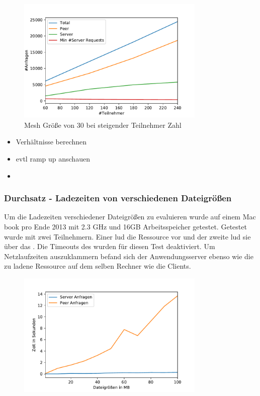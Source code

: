 \begin{figure}[!h]
	\centering
	\includegraphics[width=0.8\textwidth]{figures/meshed_30_line}
	\caption[A Figure Short-Title]{Mesh Größe von 30 bei steigender Teilnehmer Zahl}
	\label{fig:meshed_30_line}
\end{figure}

\begin{itemize}
	\item Verhältnisse berechnen
	\item evtl ramp up anschauen
	\item  
\end{itemize}

\subsubsection{Durchsatz - Ladezeiten von verschiedenen Dateigrößen}
Um die Ladezeiten verschiedener Dateigrößen zu evaluieren wurde auf einem Mac book pro Ende 2013 mit 2.3 GHz und 16GB Arbeitsspeicher getestet. 
Getestet wurde mit zwei Teilnehmern. Einer lud die Ressource vor und der zweite lud sie über das \pTp \cdn. Die Timeouts des \pTp \cdns wurden für diesen Test deaktiviert. Um Netzlaufzeiten auszuklammern befand sich der Anwendungsserver ebenso wie die zu ladene Ressource auf dem selben Rechner wie die Clients. 

\begin{figure}[!h]
	\centering
	\includegraphics[width=0.8\textwidth]{figures/Timing_file_size}
	\caption[A Figure Short-Title]{}
	\label{fig:timing_file_size}
\end{figure}

